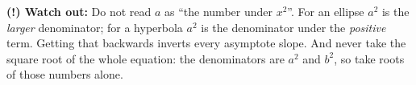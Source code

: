 \documentclass[12pt]{article}
\begin{document}
\begin{watchoutbox}
\textbf{(!) Watch out:} Do not read $a$ as ``the number under $x^2$''. For an
ellipse $a^2$ is the \emph{larger} denominator; for a hyperbola $a^2$ is the
denominator under the \emph{positive} term. Getting that backwards inverts
every asymptote slope. And never take the square root of the whole equation:
the denominators are $a^2$ and $b^2$, so take roots of those numbers alone.
\end{watchoutbox}
\end{document}
